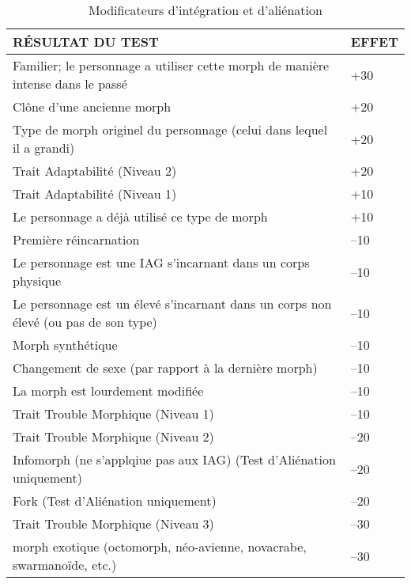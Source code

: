 \begin{table} \caption{Modificateurs d'intégration et d'aliénation} \begin{tabular}{|l|l|} 

\hline

RÉSULTAT DU TEST &EFFET\\ \hline

Familier; le personnage a utiliser cette morph de manière intense dans le passé &+30 \\ \hline

Clône d'une ancienne morph &+20 \\ \hline

Type de morph originel du personnage (celui dans lequel il a grandi) &+20 \\ \hline

Trait Adaptabilité (Niveau 2) &+20 \\ \hline

Trait Adaptabilité (Niveau 1) &+10 \\ \hline

Le personnage a déjà utilisé ce type de morph &+10 \\ \hline

Première réincarnation &–10 \\ \hline

Le personnage est une IAG s'incarnant dans un corps physique &–10 \\ \hline

Le personnage est un élevé s'incarnant dans un corps non élevé (ou pas de son type) &–10 \\ \hline

Morph synthétique &–10 \\ \hline

Changement de sexe (par rapport à la dernière morph) &–10 \\ \hline

La morph est lourdement modifiée &–10 \\ \hline

Trait Trouble Morphique (Niveau 1) &–10 \\ \hline

Trait Trouble Morphique (Niveau 2) &–20 \\ \hline

Infomorph (ne s'applqiue pas aux IAG) (Test d'Aliénation uniquement) &–20 \\ \hline

Fork (Test d'Aliénation uniquement) &–20 \\ \hline

Trait Trouble Morphique (Niveau 3) &–30 \\ \hline

morph exotique (octomorph, néo-avienne, novacrabe, swarmanoïde, etc.) &–30 \\ \hline

\end{tabular} \end{table} 

